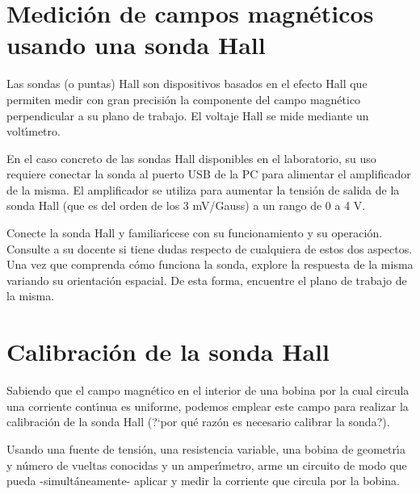 \documentclass[laboratorio]{guia}
\begin{document}
 
\maketitle

\section{Medici\'on de campos magn\'eticos usando una sonda Hall}

Las sondas (o puntas) Hall son dispositivos basados en el efecto Hall que
permiten medir con gran precisi\'on la componente del campo magn\'etico
perpendicular a su plano de trabajo. El voltaje Hall se mide mediante un
volt\'\i metro. 

En el caso concreto de las sondas Hall disponibles en el laboratorio, su uso
requiere conectar la sonda al puerto USB de la PC para alimentar el
amplificador de la misma. El amplificador se utiliza para aumentar la tensi\'on
de salida de la sonda Hall (que es del orden de los 3 mV/Gauss) a un rango
de 0 a 4 V. 

Conecte la sonda Hall y familiar\'\i cese con su funcionamiento y su
operaci\'on. Consulte a su docente si tiene dudas respecto de cualquiera de
estos dos aspectos. Una vez que comprenda c\'omo funciona la sonda, explore la
respuesta de la misma variando su orientaci\'on espacial. De esta forma,
encuentre el plano de trabajo de la misma. 

\section{Calibraci\'on de la sonda Hall}

Sabiendo que el campo magn\'etico en el interior de una bobina por la cual
circula una corriente cont\'\i nua es uniforme, podemos emplear este campo para 
realizar la calibraci\'on de la sonda Hall (?`por qu\'e raz\'on es necesario
calibrar la sonda?). 

Usando una fuente de tensi\'on, una resistencia variable, una bobina de
geometr\'\i a y n\'umero de vueltas conocidas y un amper\'\i metro, arme un
circuito de modo que pueda -simult\'aneamente- aplicar y medir la corriente que
circula por la bobina. 
\end{document}
